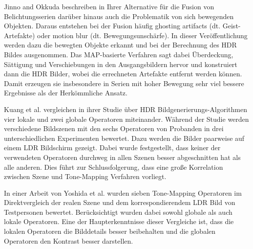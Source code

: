 Jinno and Okkuda \cite{Jinno} beschreiben in Ihrer Alternative für die Fusion von Belichtungsserien darüber hinaus auch die Problematik von sich bewegenden Objekten. Daraus entstehen bei der Fusion häufig ghosting artifacts (dt. Geist-Artefakte) oder motion blur (dt. Bewegungsunschärfe). In dieser Veröffentlichung werden dazu die bewegten Objekte erkannt und bei der Berechnung des HDR Bildes ausgenommen. Das MAP-basierte Verfahren sagt dabei Überdeckung, Sättigung und Verschiebungen in den Ausgangsbildern hervor und konstruiert dann die HDR Bilder, wobei die errechneten Artefakte entfernt werden können. Damit erzeugen sie insbesondere in Serien mit hoher Bewegung sehr viel bessere Ergebnisse als der Herkömmliche Ansatz.

Kuang et al. \cite{tone_mapper_2} vergleichen in ihrer Studie über \gls{HDR} Bildgenerierungs-Algorithmen vier lokale und zwei globale Operatoren miteinander. Während der Studie werden verschiedene Bildszenen mit den sechs Operatoren von Probanden in drei unterschiedlichen Experimenten bewertet. Dazu werden die Bilder paarweise auf einem \gls{LDR} Bildschirm gezeigt. Dabei wurde festgestellt, dass keiner der verwendeten Operatoren durchweg in allen Szenen besser abgeschnitten hat als alle anderen. Dies führt zur Schlussfolgerung, dass eine große Korrelation zwischen Szene und \gls{Tone-Mapping} Verfahren vorliegt. 

In einer Arbeit von Yoshida et al. \cite{tone_mapper_1} wurden sieben \gls{Tone-Mapping} Operatoren im Direktvergleich der realen Szene und dem korrespondierendem \gls{LDR} Bild von Testpersonen bewertet. Berücksichtigt wurden dabei sowohl globale als auch lokale Operatoren. Eine der Haupterkenntnisse dieser Vergleiche ist, dass die lokalen Operatoren die Bilddetails besser beibehalten und die globalen Operatoren den Kontrast besser darstellen.